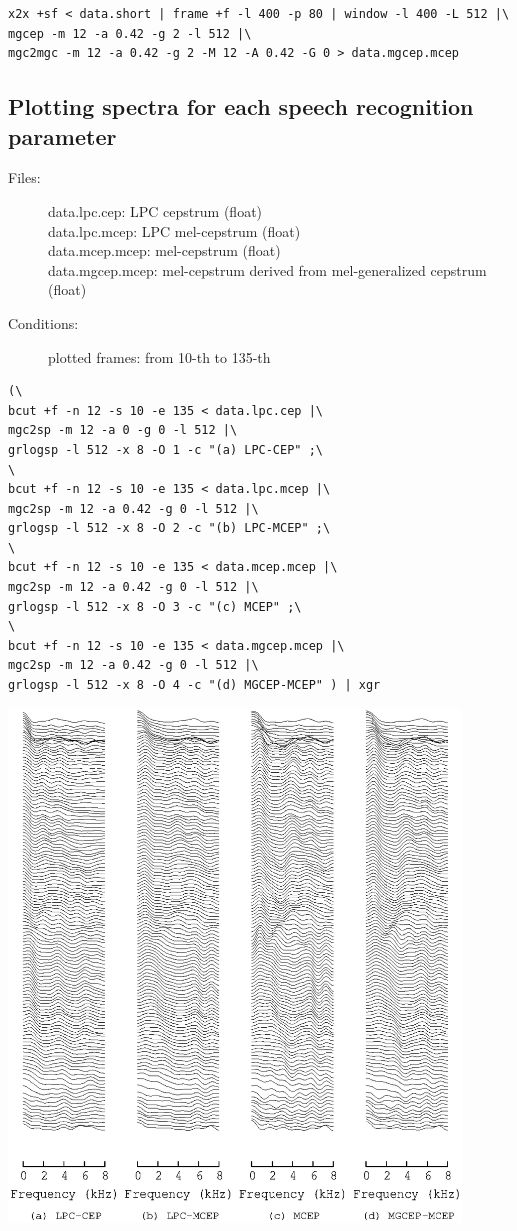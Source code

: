\documentclass[a4paper,10pt]{article}
\begin{document}
\begin{verbatim}
x2x +sf < data.short | frame +f -l 400 -p 80 | window -l 400 -L 512 |\
mgcep -m 12 -a 0.42 -g 2 -l 512 |\
mgc2mgc -m 12 -a 0.42 -g 2 -M 12 -A 0.42 -G 0 > data.mgcep.mcep
\end{verbatim}

\subsection{Plotting spectra for each speech recognition parameter}

\begin{description}
\item[Files:]
  data.lpc.cep: LPC cepstrum (float)\\
  data.lpc.mcep: LPC mel-cepstrum (float)\\
  data.mcep.mcep: mel-cepstrum  (float)\\
  data.mgcep.mcep: mel-cepstrum derived from mel-generalized cepstrum (float)
\item[Conditions:]
  plotted frames: from 10-th to 135-th\\
\end{description}

\begin{verbatim}
(\
bcut +f -n 12 -s 10 -e 135 < data.lpc.cep |\
mgc2sp -m 12 -a 0 -g 0 -l 512 |\
grlogsp -l 512 -x 8 -O 1 -c "(a) LPC-CEP" ;\
\
bcut +f -n 12 -s 10 -e 135 < data.lpc.mcep |\
mgc2sp -m 12 -a 0.42 -g 0 -l 512 |\
grlogsp -l 512 -x 8 -O 2 -c "(b) LPC-MCEP" ;\
\
bcut +f -n 12 -s 10 -e 135 < data.mcep.mcep |\
mgc2sp -m 12 -a 0.42 -g 0 -l 512 |\
grlogsp -l 512 -x 8 -O 3 -c "(c) MCEP" ;\
\
bcut +f -n 12 -s 10 -e 135 < data.mgcep.mcep |\
mgc2sp -m 12 -a 0.42 -g 0 -l 512 |\
grlogsp -l 512 -x 8 -O 4 -c "(d) MGCEP-MCEP" ) | xgr
\end{verbatim}
 
\includegraphics[width=12cm]{eps/data.all.mcep.grlogsp.eps}
\end{document}
